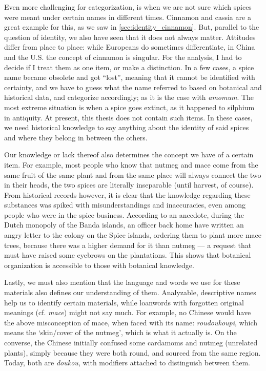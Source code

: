 
Even more challenging for categorization, is when we are not sure which spices were meant under certain names in different times. Cinnamon and cassia are a great example for this, as we saw in \cref{sec:identity_cinnamon}. But, parallel to the question of identity, we also have seen that it does not always matter. Attitudes differ from place to place: while Europeans do sometimes differentiate, in China and the U.S. the concept of cinnamon is singular. For the analysis, I had to decide if I treat them as one item, or make a distinction. In a few cases, a spice name became obsolete and got ``lost'', meaning that it cannot be identified with certainty, and we have to guess what the name referred to based on botanical and historical data, and categorize accordingly; as it is the case with \textit{amomum}. The most extreme situation is when a spice goes extinct, as it happened to silphium in antiquity. At present, this thesis does not contain such items. In these cases, we need historical knowledge to say anything about the identity of said spices and where they belong in between the others.

Our knowledge or lack thereof also determines the concept we have of a certain item. For example, most people who know that nutmeg and mace come from the same fruit of the same plant and from the same place will always connect the two in their heads, the two spices are literally inseparable (until harvest, of course). From historical records however, it is clear that the knowledge regarding these substances was spiked with misunderstandings and inaccuracies, even among people who were in the spice business. According to an anecdote, during the Dutch monopoly of the Banda islands, an officer back home have written an angry letter to the colony on the Spice islands, ordering them to plant more mace trees, because there was a higher demand for it than nutmeg --- a request that must have raised some eyebrows on the plantations. This shows that botanical organization is accessible to those with botanical knowledge.

Lastly, we must also mention that the language and words we use for these materials also defines our understanding of them. Analyzable, descriptive names help us to identify certain materials, while loanwords with forgotten original meanings (cf. \textit{mace}) might not say much. For example, no Chinese would have the above misconception of mace, when faced with its name:  \textit{roudoukoupi}, which means the `skin/cover of the nutmeg', which is what it actually is. On the converse, the Chinese initially confused some cardamoms and nutmeg (unrelated plants), simply because they were both round, and sourced from the same region. Today, both are  \textit{doukou}, with modifiers attached to distinguish between them.

